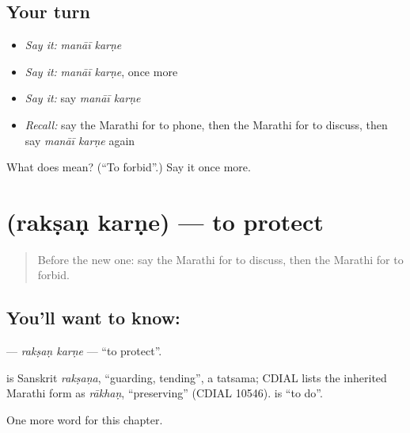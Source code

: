 \subsection*{Your turn}
\begin{itemize}
\raggedright
  \item \emph{Say it:} \emph{manāī karṇe}
  \item \emph{Say it:} \emph{manāī karṇe}, once more
  \item \emph{Say it:} say \emph{manāī karṇe}
  \item \emph{Recall:} say the Marathi for to phone, then the Marathi for to discuss, then say \emph{manāī karṇe} again
\end{itemize}

\begin{tcolorbox}[breakable,colback=teal!4,colframe=teal!35!black,title={Before you move on}]
What does   mean? (\textquotedblleft{}To forbid\textquotedblright{}.) Say it once more.
\end{tcolorbox}
\section[\texorpdfstring{\mr{रक्षण} \mr{करणे} (rakṣaṇ karṇe)}{रक्षण करणे (rakṣaṇ karṇe)}]{  (rakṣaṇ karṇe) — to protect}

\label{lesson:MR-C194-raksan-karne}



\begin{quote}
Before the new one: say the Marathi for to discuss, then the Marathi for to forbid.
\end{quote}

\subsection*{You'll want to know:  }
\textbf{ } — \emph{rakṣaṇ karṇe} — \textquotedblleft{}to protect\textquotedblright{}.

\begin{cousinweb}
\textbf{} is Sanskrit \emph{rakṣaṇa}, \textquotedblleft{}guarding, tending\textquotedblright{}, a tatsama; CDIAL lists the inherited Marathi form as \emph{rākhaṇ}, \textquotedblleft{}preserving\textquotedblright{} (CDIAL 10546). \textbf{} is \textquotedblleft{}to do\textquotedblright{}.
\end{cousinweb}

\begin{grammarlens}[title={What you've built}]
One more word for this chapter.
\end{grammarlens}


